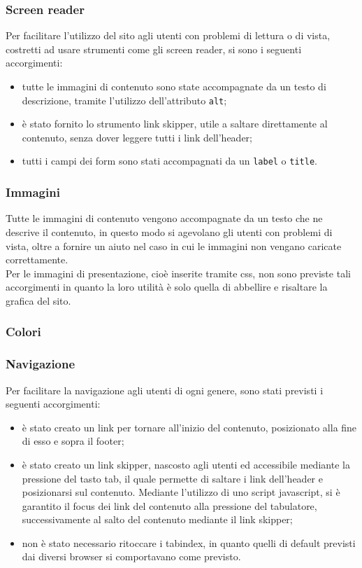 		\subsubsection{Screen reader}
		Per facilitare l'utilizzo del sito agli utenti con problemi di lettura o di vista, costretti ad usare strumenti come gli screen reader, si sono i seguenti accorgimenti:
		\begin{itemize}
			\item tutte le immagini di contenuto sono state accompagnate da un testo di descrizione, tramite l'utilizzo dell'attributo \texttt{alt};
			\item è stato fornito lo strumento link skipper, utile a saltare direttamente al contenuto, senza dover leggere tutti i link dell'header;
			\item tutti i campi dei form sono stati accompagnati da un \texttt{label} o \texttt{title}.
		\end{itemize}
		\subsubsection{Immagini}
		Tutte le immagini di contenuto vengono accompagnate da un testo che ne descrive il contenuto, in questo modo si agevolano gli utenti con problemi di vista, oltre a fornire un aiuto nel caso in cui le immagini non vengano caricate correttamente. \\
		Per le immagini di presentazione, cioè inserite tramite css, non sono previste tali accorgimenti in quanto la loro utilità è solo quella di abbellire e risaltare la grafica del sito.
		\subsubsection{Colori}
		
		\subsubsection{Navigazione}
		Per facilitare la navigazione agli utenti di ogni genere, sono stati previsti i seguenti accorgimenti:
		\begin{itemize}
			\item è stato creato un link per tornare all'inizio del contenuto, posizionato alla fine di esso e sopra il footer;
			\item è stato creato un link skipper, nascosto agli utenti ed accessibile mediante la pressione del tasto tab, il quale permette di saltare i link dell'header e posizionarsi sul contenuto. Mediante l'utilizzo di uno script javascript, si è garantito il focus dei link del contenuto alla pressione del tabulatore, successivamente al salto del contenuto mediante il link skipper;
			\item non è stato necessario ritoccare i tabindex, in quanto quelli di default previsti dai diversi browser si comportavano come previsto.
		\end{itemize}
